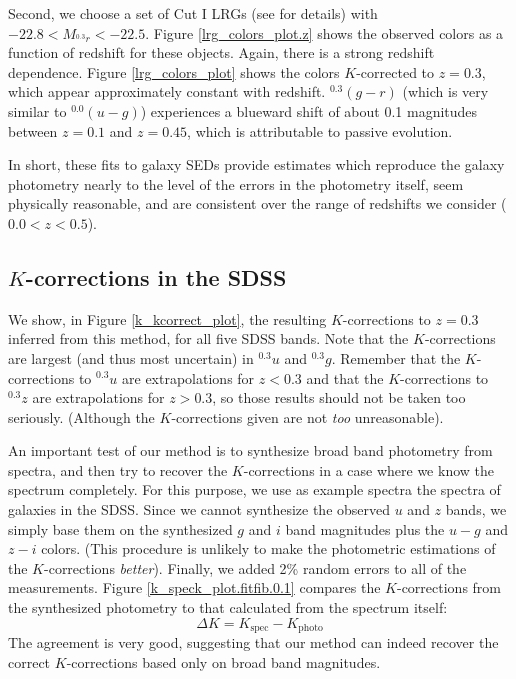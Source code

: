 \documentclass[10pt,preprint]{aastex}
\newcommand{\band}[2]{\ensuremath{^{#1}\!{#2}}}
\begin{document}
Second, we choose a set of Cut I LRGs (see \citealt{eisenstein01a} for
details) with $-22.8 < M_{\band{0.3}{r}} < -22.5$. Figure
\ref{lrg_colors_plot.z} shows the observed colors as a function of
redshift for these objects. Again, there is a strong redshift
dependence. Figure \ref{lrg_colors_plot} shows the colors
$K$-corrected to $z=0.3$, which appear approximately constant with
redshift.
$\band{0.3}{(g-r)}$ (which is very similar to $\band{0.0}{(u-g)}$)
experiences a blueward shift of about 0.1 magnitudes between $z=0.1$
and $z=0.45$, which is attributable to passive evolution.

In short, these fits to galaxy SEDs provide estimates which reproduce
the galaxy photometry nearly to the level of the errors in the
photometry itself, seem physically reasonable, and are consistent over
the range of redshifts we consider ($0.0 < z < 0.5$). 

\subsection{$K$-corrections in the SDSS}

We show, in Figure \ref{k_kcorrect_plot}, the resulting $K$-corrections to
$z=0.3$ inferred from this method, for all five SDSS bands. Note that
the $K$-corrections are largest (and thus most uncertain) in
$\band{0.3}{u}$ and $\band{0.3}{g}$. Remember that the $K$-corrections
to $\band{0.3}{u}$ are extrapolations for $z<0.3$ and that the
$K$-corrections to $\band{0.3}{z}$ are extrapolations for $z>0.3$, so
those results should not be taken too seriously. (Although the
$K$-corrections given are not {\it too} unreasonable).

An important test of our method is to synthesize broad band photometry
from spectra, and then try to recover the $K$-corrections in a case
where we know the spectrum completely. For this purpose, we use as
example spectra the spectra of galaxies in the SDSS.  Since we cannot
synthesize the observed $u$ and $z$ bands, we simply base them on the
synthesized $g$ and $i$ band magnitudes plus the $u-g$ and $z-i$
colors. (This procedure is unlikely to make the photometric
estimations of the $K$-corrections {\it better}). Finally, we added
2\% random errors to all of the measurements. Figure
\ref{k_speck_plot.fitfib.0.1} compares the $K$-corrections from the
synthesized photometry to that calculated from the spectrum
itself: 
\begin{equation}
\Delta K = K_{\mathrm{spec}} - K_{\mathrm{photo}}
\end{equation}
The agreement is very good, suggesting that our method can
indeed recover the correct $K$-corrections based only on broad band
magnitudes.
\end{document}
